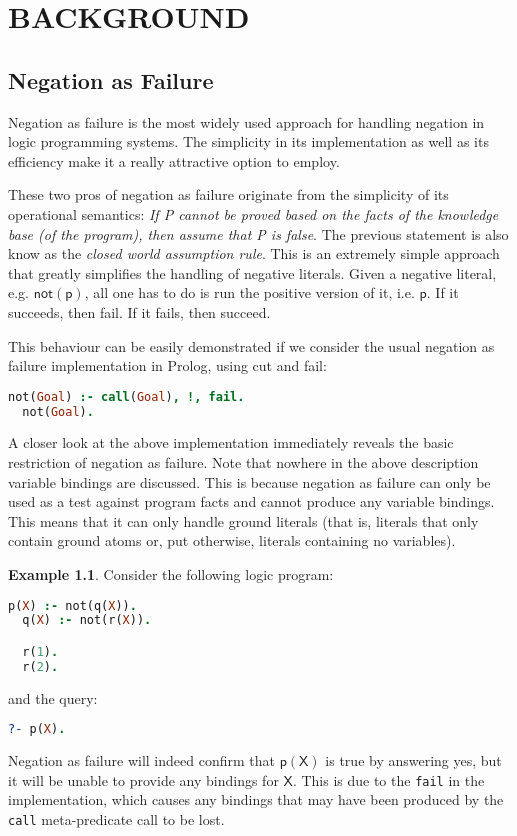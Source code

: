 \documentclass[inscr,ack,preface]{dithesis}
\theoremstyle{definition}
\newtheorem{example}{Example}[chapter]
\newcommand{\msf}[1]{$\mathsf{#1}$}
\begin{document}
\chapter{BACKGROUND}
\label{chap:background}

\section{Negation as Failure}
Negation as failure is the most widely used approach for handling negation in logic programming systems. The simplicity in its implementation as well as its efficiency make it a really attractive option to employ.

These two pros of negation as failure originate from the simplicity of its operational semantics: \emph{If P cannot be proved based on the facts of the knowledge base (of the program), then assume that P is false}. The previous statement is also know as the \emph{closed world assumption rule}. This is an extremely simple approach that greatly simplifies the handling of negative literals. Given a negative literal, e.g. \msf{not(p)}, all one has to do is run the positive version of it, i.e. \msf{p}. If it succeeds, then fail. If it fails, then succeed.

This behaviour can be easily demonstrated if we consider the usual negation as failure implementation in Prolog, using cut and fail:

\begin{lstlisting}[language=Prolog,frame=single]
  not(Goal) :- call(Goal), !, fail.
  not(Goal).
\end{lstlisting}

A closer look at the above implementation immediately reveals the basic restriction of negation as failure. Note that nowhere in the above description variable bindings are discussed. This is because negation as failure can only be used as a test against program facts and cannot produce any variable bindings. This means that it can only handle ground literals (that is, literals that only contain ground atoms or, put otherwise, literals containing no variables).

\begin{example} Consider the following logic program:
\begin{lstlisting}[language=Prolog,frame=single]
  p(X) :- not(q(X)).
  q(X) :- not(r(X)).

  r(1).
  r(2).
\end{lstlisting}
and the query:
\begin{lstlisting}[language=Prolog,frame=single]
  ?- p(X).
\end{lstlisting}
Negation as failure will indeed confirm that \msf{p(X)} is true by answering yes, but it will be unable to provide any bindings for \msf{X}. This is due to the \texttt{fail} in the implementation, which causes any bindings that may have been produced by the \texttt{call} meta-predicate call to be lost.
\end{example}
\end{document}
